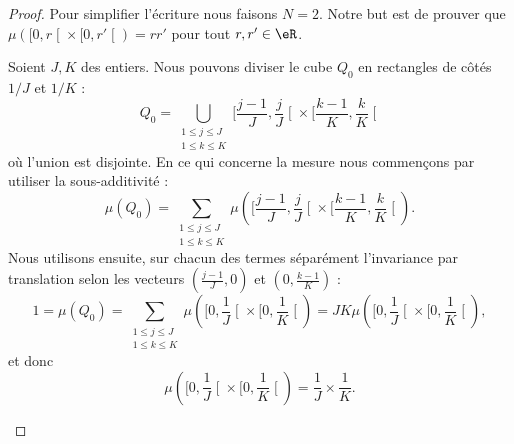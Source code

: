 																																			\begin{proof}
																																			Pour simplifier l'écriture nous faisons \( N=2\). Notre but est de prouver que \( \mu(  \mathopen[ 0 , r \mathclose[\times \mathopen[ 0 , r' \mathclose[ )=rr'\) pour tout \( r,r'\in \eR\).

																																			\begin{subproof}
																																			\spitem[Longueur =\( 1/J\)]
																																			Soient \( J,K\) des entiers. Nous pouvons diviser le cube \( Q_0\) en rectangles de côtés \( 1/J\) et \( 1/K\) :
																																				\begin{equation}
																																				Q_0=\bigcup_{\substack{1\leq j\leq J\\1\leq k\leq K}}\mathopen[ \frac{ j-1 }{ J } , \frac{ j }{ J } \mathclose[\times \mathopen[ \frac{ k-1 }{ K } , \frac{ k }{ K } \mathclose[
																																					\end{equation}
																																					où l'union est disjointe. En ce qui concerne la mesure nous commençons par utiliser la sous-additivité :
																																					\begin{equation}
																																					\mu(Q_0)=\sum_{\substack{1\leq j\leq J\\1\leq k\leq K}}\mu\left(  \mathopen[ \frac{ j-1 }{ J } , \frac{ j }{ J } \mathclose[\times \mathopen[ \frac{ k-1 }{ K } , \frac{ k }{ K } \mathclose[      \right).
																																					\end{equation}
																																					Nous utilisons ensuite, sur chacun des termes séparément l'invariance par translation selon les vecteurs \( (\frac{ j-1 }{ J },0)\) et \( ( 0,\frac{ k-1 }{ K } )\) :
																																						\begin{equation}
																																						1=\mu(Q_0)=\sum_{\substack{1\leq j\leq J\\1\leq k\leq K}}\mu\left(  \mathopen[ 0,\frac{1}{ J } \mathclose[\times \mathopen[0,\frac{1}{ K }\mathclose[      \right)=JK\mu\left(  \mathopen[ 0,\frac{1}{ J } \mathclose[\times \mathopen[0,\frac{1}{ K }\mathclose[      \right),
																																						\end{equation}
																																						et donc
																																						\begin{equation}
																																						\mu\left(  \mathopen[ 0,\frac{1}{ J } \mathclose[\times \mathopen[0,\frac{1}{ K }\mathclose[      \right)=\frac{1}{ J }\times \frac{1}{ K }.
																																						\end{equation}
																																						\spitem[Longueur \( L/K\)]


\end{subproof}
\end{proof}
